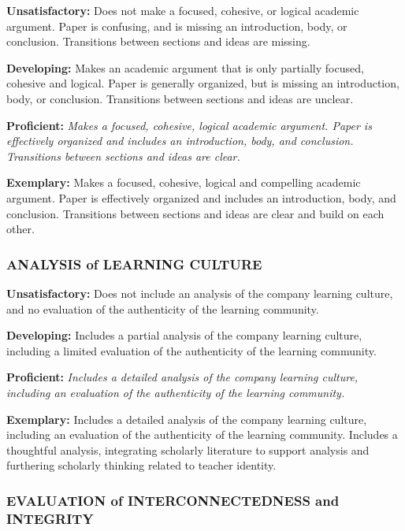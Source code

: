 \documentclass[
]{book}
\begin{document}
\textbf{Unsatisfactory:} Does not make a focused, cohesive, or logical academic argument. Paper is
confusing, and is missing an introduction, body, or conclusion. Transitions
between sections and ideas are missing.

\textbf{Developing:} Makes an academic argument that is only partially focused, cohesive and logical.
Paper is generally organized, but is missing an introduction, body, or
conclusion. Transitions between sections and ideas are unclear.

\textbf{Proficient:} \emph{Makes a focused, cohesive, logical academic argument. Paper is effectively
organized and includes an introduction, body, and conclusion. Transitions
between sections and ideas are clear.}

\textbf{Exemplary:} Makes a focused, cohesive, logical and compelling academic argument. Paper is
effectively organized and includes an introduction, body, and conclusion.
Transitions between sections and ideas are clear and build on each other.

\hypertarget{analysis-of-learning-culture}{%
\subsubsection*{ANALYSIS of LEARNING CULTURE}\label{analysis-of-learning-culture}}

\textbf{Unsatisfactory:} Does not include an analysis of the company learning culture, and no evaluation
of the authenticity of the learning community.

\textbf{Developing:} Includes a partial analysis of the company learning culture, including a limited
evaluation of the authenticity of the learning community.

\textbf{Proficient:} \emph{Includes a detailed analysis of the company learning culture, including an
evaluation of the authenticity of the learning community.}

\textbf{Exemplary:} Includes a detailed analysis of the company learning culture, including an
evaluation of the authenticity of the learning community. Includes a thoughtful
analysis, integrating scholarly literature to support analysis and furthering
scholarly thinking related to teacher identity.

\hypertarget{evaluation-of-interconnectedness-and-integrity}{%
\subsubsection*{EVALUATION of INTERCONNECTEDNESS and INTEGRITY}\label{evaluation-of-interconnectedness-and-integrity}}
\end{document}
